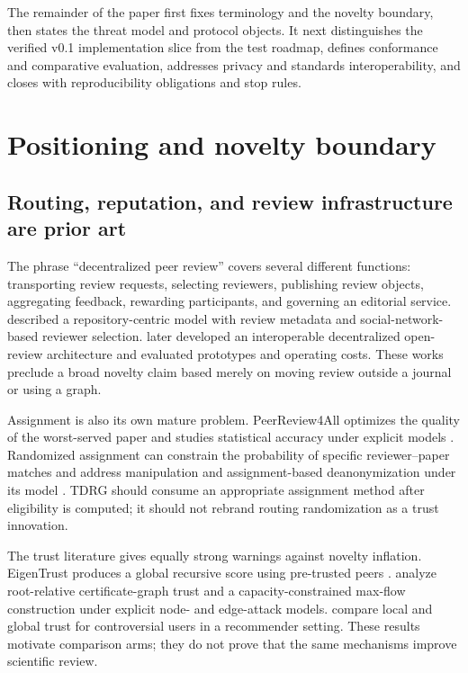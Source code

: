 \documentclass[11pt]{article}
\newcommand{\tdrg}{TDRG}
\begin{document}

The remainder of the paper first fixes terminology and the novelty boundary,
then states the threat model and protocol objects. It next distinguishes the
verified v0.1 implementation slice from the test roadmap, defines conformance and
comparative evaluation, addresses privacy and standards interoperability, and
closes with reproducibility obligations and stop rules.

\section{Positioning and novelty boundary}

\subsection{Routing, reputation, and review infrastructure are prior art}

The phrase ``decentralized peer review'' covers several different functions:
transporting review requests, selecting reviewers, publishing review objects,
aggregating feedback, rewarding participants, and governing an editorial service.
\citet{rodriguez2006convergence} described a repository-centric model with review
metadata and social-network-based reviewer selection. \citet{tenoriofornes2021decentralizing}
later developed an interoperable decentralized open-review architecture and
evaluated prototypes and operating costs. These works preclude a broad novelty
claim based merely on moving review outside a journal or using a graph.

Assignment is also its own mature problem. PeerReview4All optimizes the quality of
the worst-served paper and studies statistical accuracy under explicit models
\citep{stelmakh2021peerreview4all}. Randomized assignment can constrain the
probability of specific reviewer--paper matches and address manipulation and
assignment-based deanonymization under its model \citep{jecmen2020mitigating}.
\tdrg{} should consume an appropriate assignment method after eligibility is
computed; it should not rebrand routing randomization as a trust innovation.

The trust literature gives equally strong warnings against novelty inflation.
EigenTrust produces a global recursive score using pre-trusted peers
\citep{kamvar2003eigentrust}. \citet{levien1998attack} analyze root-relative
certificate-graph trust and a capacity-constrained max-flow construction under
explicit node- and edge-attack models. \citet{massa2005controversial} compare local
and global trust for controversial users in a recommender setting. These results
motivate comparison arms; they do not prove that the same mechanisms improve
scientific review.
\end{document}
